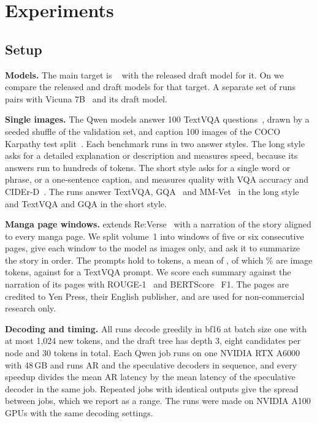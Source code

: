 \section{Experiments}
\label{sec:experiments}

\subsection{Setup}
\label{sec:setup}

\noindent\textbf{Models.}
The main target is \qwenS~\cite{bai2025qwen25vl} with the released \vispec draft model for it.
On \qwenL we compare the released \vispec and \hivis draft models for that target.
A separate set of runs pairs \llava with Vicuna 7B~\cite{liu2024llavanext} and its \vispec draft model.

\noindent\textbf{Single images.}
The Qwen models answer 100 TextVQA questions~\cite{singh2019textvqa}, drawn by a seeded shuffle of the validation set, and caption 100 images of the COCO Karpathy test split~\cite{chen2015coco,karpathy2015deep}.
Each benchmark runs in two answer styles.
The long style asks for a detailed explanation or description and measures speed, because its answers run to hundreds of tokens.
The short style asks for a single word or phrase, or a one-sentence caption, and measures quality with VQA accuracy and CIDEr-D~\cite{vedantam2015cider}.
The \llava runs answer TextVQA, GQA~\cite{hudson2019gqa} and MM-Vet~\cite{yu2024mmvet} in the long style and TextVQA and GQA in the short style.

\noindent\textbf{Manga page windows.}
\rvp extends Re:Verse~\cite{baranwal2025reverse} with a narration of the story aligned to every manga page.
We split volume~1 into \pagesN windows of five or six consecutive pages, give each window to the model as images only, and ask it to summarize the story in order.
The prompts hold \pagesPromptMin to \pagesPromptMax tokens, a mean of \pagesPromptMean, of which \pagesImageShare\% are image tokens, against \promptTextvqa for a TextVQA prompt.
We score each summary against the narration of its pages with ROUGE-1~\cite{lin2004rouge} and BERTScore~\cite{zhang2020bertscore} F1.
The pages are credited to Yen Press, their English publisher, and are used for non-commercial research only.

\noindent{}\textbf{Decoding and timing.} 
All runs decode greedily in bf16 at batch size one with at most 1,024 new tokens, and the draft tree has depth 3, eight candidates per node and 30 tokens in total.
Each Qwen job runs on one NVIDIA RTX A6000 with 48\,GB and runs AR and the speculative decoders in sequence, and every speedup divides the mean AR latency by the mean latency of the speculative decoder in the same job.
Repeated jobs with identical outputs give the spread between jobs, which we report as a range.
The \llava runs were made on NVIDIA A100 GPUs with the same decoding settings.

